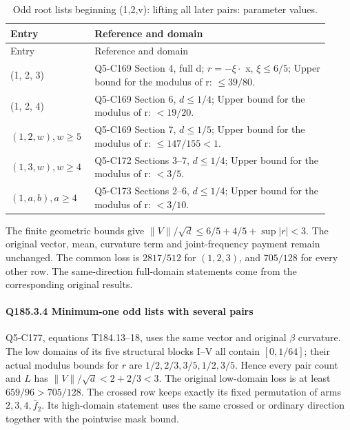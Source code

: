 \begingroup\small
\setlength{\tabcolsep}{3pt}
\setlength{\LTleft}{0pt}\setlength{\LTright}{\fill}
\begin{longtable}{@{}p{0.2200\linewidth}p{0.7000\linewidth}@{}}
\caption{Odd root lists beginning (1,2,v): lifting all later pairs: parameter values.}\label{tab:parameters:q5-c185:2}\\
\toprule
Entry & Reference and domain \\
\midrule\endfirsthead
\toprule
Entry & Reference and domain \\
\midrule\endhead
\bottomrule\endfoot
(1, 2, 3) & Q5-C169 Section 4, full d; \(r=-\xi\cdot\) x, \(\xi\le 6/5\); Upper bound for the modulus of r: \(\le 39/80\). \\
\addlinespace[2pt]
(1, 2, 4) & Q5-C169 Section 6, \(d\le 1/4\); Upper bound for the modulus of r: \(<19/20\). \\
\addlinespace[2pt]
\((1,\allowbreak 2,\allowbreak w),\allowbreak w\ge 5\) & Q5-C169 Section 7, \(d\le 1/5\); Upper bound for the modulus of r: \(\le 147/155<1\). \\
\addlinespace[2pt]
\((1,\allowbreak 3,\allowbreak w),\allowbreak w\ge 4\) & Q5-C172 Sections 3--7, \(d\le 1/4\); Upper bound for the modulus of r: \(<3/5\). \\
\addlinespace[2pt]
\((1,\allowbreak a,\allowbreak b),\allowbreak a\ge 4\) & Q5-C173 Sections 2--6, \(d\le 1/4\); Upper bound for the modulus of r: \(<3/10\). \\
\end{longtable}
\endgroup


The finite geometric bounds give \(\|V\|/\sqrt d\le6/5+4/5+\sup|r|<3\). The original vector, mean, curvature term and joint-frequency payment remain unchanged. The common loss is \(2817/512\) for \((1,\allowbreak \allowbreak  2,\allowbreak \allowbreak  3)\), and \(705/128\) for every other row. The same-direction full-domain statements come from the corresponding original results.

\paragraph{Q185.3.4 Minimum-one odd lists with several pairs}

Q5-C177, equations T184.13--18, uses the same vector and original \(\beta\) curvature. The low domains of its five structural blocks I--V all contain \([0,\allowbreak \allowbreak  1/64]\); their actual modulus bounds for \(r\) are \(1/2,\allowbreak \allowbreak  2/3,\allowbreak \allowbreak  3/5,\allowbreak \allowbreak  1/2,\allowbreak \allowbreak  3/5\). Hence every pair count and \(L\) has \(\|V\|/\sqrt d<2+2/3<3\). The original low-domain loss is at least \(659/96>705/128\). The crossed row keeps exactly its fixed permutation of arms \(2,\allowbreak \allowbreak  3,\allowbreak \allowbreak  4,\allowbreak \allowbreak  \bar f_2\). Its high-domain statement uses the same crossed or ordinary direction together with the pointwise mask bound.

